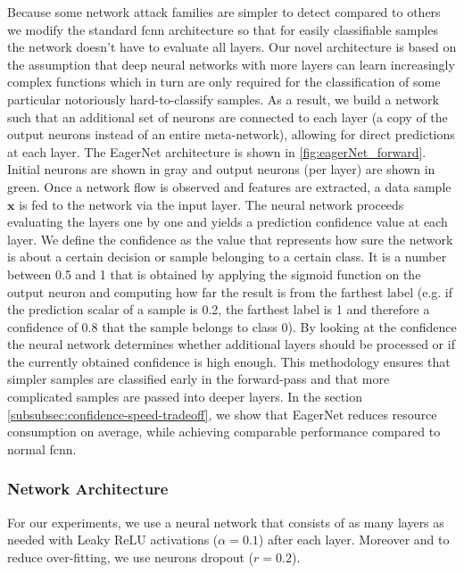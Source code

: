 \documentclass[conference]{IEEEtran}
\begin{document}
Because some network attack families are simpler to detect compared to others we modify the standard \gls{fcnn} architecture so that for easily classifiable samples the network doesn't have to evaluate all layers. Our novel architecture is based on the assumption that deep neural networks with more layers can learn increasingly complex functions which in turn are only required for the classification of some particular notoriously hard-to-classify samples. As a result, we build a network such that an additional set of neurons are connected to each layer (a copy of the output neurons instead of an entire meta-network), allowing for direct predictions at each layer. The EagerNet architecture is shown in \autoref{fig:eagerNet_forward}. Initial neurons are shown in gray and output neurons (per layer) are shown in green. Once a network flow is observed and features are extracted, a data sample $\textbf{x}$ is fed to the network via the input layer. The neural network proceeds evaluating the layers one by one and yields a prediction confidence value at each layer. We define the confidence as the value that represents how sure the network is about a certain decision or sample belonging to a certain class. It is a number between 0.5 and 1 that is obtained by applying the sigmoid function \cite{noauthor_sigmoid_2020} on the output neuron and computing how far the result is from the farthest label (e.g. if the prediction scalar of a sample is 0.2, the farthest label is 1 and therefore a confidence of 0.8 that the sample belongs to class 0). By looking at the confidence the neural network determines whether additional layers should be processed or if the currently obtained confidence is high enough. This methodology ensures that simpler samples are classified early in the forward-pass and that more complicated samples are passed into deeper layers. In the section \ref{subsubsec:confidence-speed-tradeoff}, we show that EagerNet reduces resource consumption on average, while achieving comparable performance compared to normal \gls{fcnn}.


\subsubsection{Network Architecture}
For our experiments, we use a neural network that consists of as many layers as needed with Leaky ReLU activations \cite{maas_rectifier_2013} ($\alpha = 0.1$) after each layer. Moreover and to reduce over-fitting, we use neurons dropout ($r=0.2$).
\end{document}
